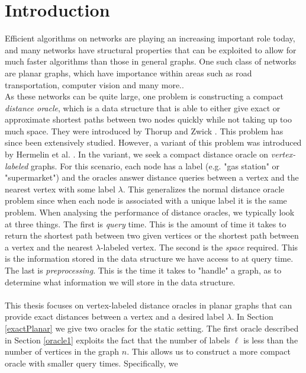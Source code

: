 \section{Introduction}\label{introduction}
Efficient algorithms on networks are playing an increasing important role today, and many
networks have structural properties that can be exploited to allow for much faster
algorithms than those in general graphs. One such class of networks are planar graphs, which have importance within
areas such as road transportation, computer vision and many more.. \\
As these networks can be quite large, one problem is constructing a compact \textit{distance
oracle}, which is a data structure that is able to either give exact or approximate
shortest paths between two nodes quickly while not taking up too much space. They were
introduced by Thorup and Zwick \cite{thorup2005approximate}. This problem has since been
extensively studied. However, a variant of this problem
was introduced by Hermelin et al. \cite{hermelin2011distance}. In the variant, we seek a
compact distance oracle on \textit{vertex-labeled} graphs. For this scenario, each node has a label (e.g. "gas
station" or "supermarket") and the oracles answer distance queries between a vertex and
the nearest vertex with some label $\lambda$. This generalizes the normal distance oracle problem since when each node is
associated with a unique label it is the same problem.
When analysing the performance of
distance oracles, we typically look at three things. The first is \textit{query} time.
This is the amount of time it takes to return the shortest path between two given
vertices or the shortest path between a vertex and the nearest $\lambda$-labeled vertex.
The second is the \textit{space} required. This is the information stored in the data
structure we have access to at query time. The last is \textit{preprocessing}. This is
the time it takes to "handle" a graph, as to determine what information we will store
in the data structure. \\
\\
This thesis focuses on vertex-labeled distance oracles in planar graphs that can provide
exact distances between a vertex and a desired label $\lambda$. In Section \ref{exactPlanar} we
give two oracles for the static setting. The first oracle described in Section \ref{oracle1}
exploits the fact that
the number of labels $\ell$ is less than the number of vertices in the graph $n$. This
allows us to construct a more compact oracle with smaller query times. Specifically, we
